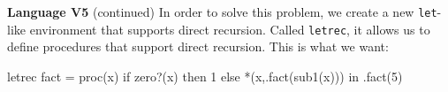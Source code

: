 \begin{minipage}[t]{\sw}
\slidenumber
\LARGE
{\bf Language V5} (continued)\exx
In order to solve this problem,
we create a new \verb'let'-like environment
that supports direct recursion.
Called \verb'letrec',
it allows us to define procedures
that support direct recursion.\exx
This is what we want:
\Large
\begin{qv}
letrec
  fact = proc(x) if zero?(x) then 1 else *(x,.fact(sub1(x)))
in
  .fact(5)
\end{qv}
\end{minipage}
\clearpage
